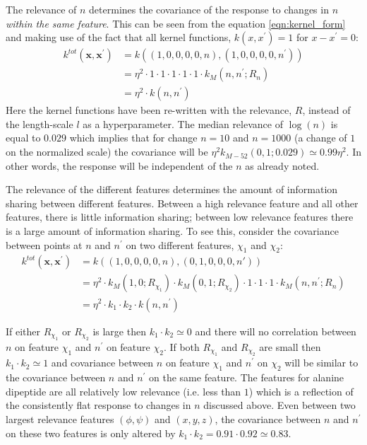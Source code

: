 The relevance of $n$ determines the covariance of the response to changes in $n$ \emph{within the same feature}. This can be seen from the equation \ref{eqn:kernel_form} and making use of the fact that all kernel functions, $k(x, x^{\prime})=1$ for $x-x^{\prime}=0$:
\begin{equation*}
\begin{split}
    k^{tot}(\mathbf{x}, \mathbf{x}^{\prime})& = k\left((1, 0, 0, 0, 0, n), (1, 0, 0, 0, 0, n^{\prime})\right) \\
    & = \eta^{2}\cdot 1 \cdot 1\cdot 1 \cdot 1\cdot 1 \cdot k_{M}(n, n^{\prime}; R_{n}) \\
    & = \eta^{2}\cdot k(n, n^{\prime})
\end{split}
\end{equation*}
Here the kernel functions have been re-written with the relevance, $R$, instead of the length-scale $l$ as a hyperparameter. The median relevance of $\log{(n)}$ is equal to $\num{0.029}$ which implies that for change $n=10$ and $n=1000$ (a change of $1$ on the normalized scale) the covariance will be $\eta^{2}k_{M-52}(0,1; 0.029) \simeq 0.99\eta^{2}$. In other words, the response will be independent of the $n$ as already noted. 

The relevance of the different features determines the amount of information sharing between different features\cite{duvenaud2011additive}. Between a high relevance feature and all other features, there is little information sharing; between low relevance features there is a large amount of information sharing. To see this, consider the covariance between points at $n$ and $n^{\prime}$ on two different features, $\chi_1$ and $\chi_2$: 
\begin{equation*}
\begin{split}
    k^{tot}(\mathbf{x}, \mathbf{x}^{\prime})& = k\left((1, 0, 0, 0, 0, n), (0, 1, 0, 0, 0, n')\right) \\
    & = \eta^{2}\cdot k_{M}\left(1, 0; R_{\chi_1}\right) \cdot k_{M}\left(0, 1; R_{\chi_2}\right) \cdot 1 \cdot 1\cdot 1 \cdot k_{M}(n, n^{\prime}; R_{n}) \\
    &=  \eta^{2}\cdot k_{1}\cdot k_{2}\cdot k(n, n^{\prime})
\end{split}
\end{equation*}

If either $R_{\chi_1}$ or $R_{\chi_2}$ is large then $k_1 \cdot k_2 \simeq 0$ and there will no correlation between $n$ on feature $\chi_1$ and $n^{\prime}$ on feature $\chi_2$. If both $R_{\chi_1}$ and $R_{\chi_2}$ are small then $k_1 \cdot k_2 \simeq 1$ and covariance between $n$ on feature $\chi_1$ and $n^{\prime}$ on $\chi_2$ will be similar to the covariance between $n$ and $n^{\prime}$ on the same feature.  The features for alanine dipeptide are all relatively low relevance (i.e. less than $1$) which is a reflection of the  consistently flat response to changes in $n$ discussed above. Even between  two largest relevance features $(\phi, \psi)$ and $(x,y,z)$, the covariance between $n$ and $n^{\prime}$ on these two features is only altered by  $k_{1}\cdot k_{2} = 0.91\cdot0.92 \simeq 0.83$. 

